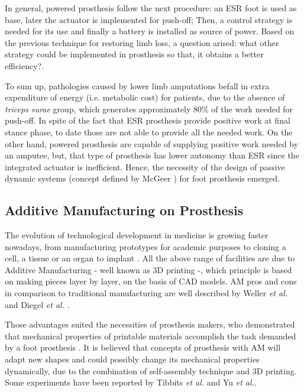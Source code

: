 \documentclass[12pt,english]{article}
\begin{document}
In general, powered prosthesis follow the next procedure: an ESR foot is used as base, later the actuator is implemented for push-off; Then, a control strategy is needed for its use and finally a battery is installed as source of power. Based on the previous technique for restoring limb loss, a question arised: what other strategy could be implemented in prosthesis so that, it obtains a better efficiency?.  

To sum up, pathologies caused by lower limb amputations befall in extra expenditure of energy (i.e. metabolic cost) for patients, due to the absence of \emph{triceps surae} group, which generates approximately 80\% of the work needed for push-off. In spite of the fact that ESR prosthesis provide positive work at final stance phase, to date those are not able to provide all the needed work. On the other hand, powered prosthesis are capable of supplying positive work needed by an amputee, but, that type of prosthesis has lower autonomy than ESR since the integrated actuator is inefficient. Hence, the necessity of the design of passive dynamic systems (concept defined by McGeer \cite{mcgeer1990passive}) for foot prosthesis emerged. 

\subsection{Additive Manufacturing on Prosthesis}

The evolution of technological development in medicine is growing faster nowadays, from manufacturing prototypes for academic purposes to cloning a cell, a tissue or an organ to implant \cite{Michalski2014}. All the above range of facilities are due to Additive Manufacturing  - well known as 3D printing -, which principle is based on making pieces layer by layer, on the basis of CAD models. AM pros and cons in comparison to traditional manufacturing are well described by Weller \emph{et al.}\cite{Weller2015} and Diegel \emph{et al.} \cite{Diegel2014}.  

Those advantages suited the necessities of prosthesis makers, who demonstrated that mechanical properties of printable materials accomplish the task demanded by a foot prosthesis \cite{South2010, Yap2015}. It is believed that concepts of prosthesis with AM will adapt new shapes and could possibly change its mechanical properties  dynamically, due to the combination of self-assembly technique and 3D printing. Some experiments have been reported by Tibbits \emph{et al.}\cite{Tibbits2014,Raviv2014} and Yu \emph{et al.}\cite{Yu2015}.
\end{document}

